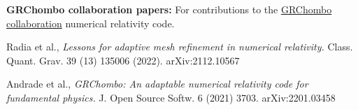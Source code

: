 \documentclass{my_cv}
\begin{document}
{\bf GRChombo collaboration papers:} For contributions to the 
\href{https://www.grchombo.org/}{GRChombo collaboration} 
numerical relativity code.
\begin{etaremune}
\item Radia et al., 
   \emph{Lessons for adaptive mesh refinement in numerical relativity.}
    Class. Quant. Grav. 39 (13) 135006 (2022).
    arXiv:2112.10567

\item Andrade et al.,
   \emph{GRChombo: An adaptable numerical relativity code for fundamental physics.}
   J. Open Source Softw. 6 (2021) 3703. 
   arXiv:2201.03458

\end{etaremune}
\end{document}
